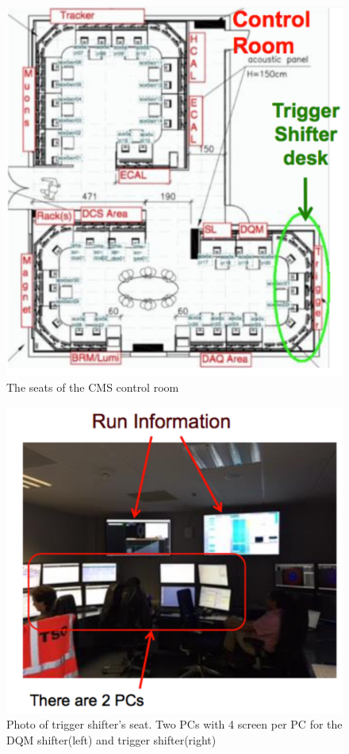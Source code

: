 \documentclass{article}
\begin{document}
\begin{figure}
\centering
\includegraphics[width=.7\textwidth]{figures/TriggerShift_seat.pdf}
\caption{The seats of the CMS control room}
\label{pics:blablabla}
\end{figure}

\begin{figure}
\centering
\includegraphics[width=.7\textwidth]{figures/TriggerShift_photo.pdf}
\caption{Photo of trigger shifter's seat. Two PCs with 4 screen per PC for the DQM shifter(left) and trigger shifter(right)}
\label{pics:blablabla}
\end{figure}
\end{document}
